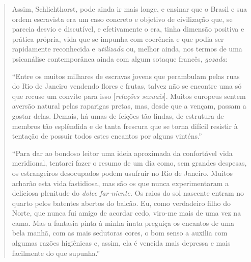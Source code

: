 \begin{quote}
Assim, Schlichthorst, pode ainda ir mais longe, e ensinar que o Brasil e
sua ordem escravista era um caso concreto e objetivo de civilização que,
se parecia desvio e discutível, e efetivamente o era, tinha dimensão
positiva e prática própria, vida que se impunha com coerência e que
podia ser rapidamente reconhecida e \emph{utilizada} ou, melhor ainda,
nos termos de uma psicanálise contemporânea ainda com algum sotaque
francês, \emph{gozada}:

``Entre os muitos milhares de escravas jovens que perambulam pelas ruas
do Rio de Janeiro vendendo flores e frutas, talvez não se encontre uma
só que recuse um convite para isso {[}\emph{relações sexuais}{]}. Muitos
europeus sentem aversão natural pelas raparigas pretas, mas, desde que a
vençam, passam a gostar delas. Demais, há umas de feições tão lindas, de
estrutura de membros tão esplêndida e de tanta frescura que se torna
difícil resistir à tentação de possuir todos estes encantos por alguns
vinténs.''

``Para dar ao bondoso leitor uma ideia aproximada da confortável vida
meridional, tentarei fazer o resumo de um dia como, sem grandes
despesas, os estrangeiros desocupados podem usufruir no Rio de Janeiro.
Muitos acharão esta vida fastidiosa, mas são os que nunca experimentaram
a deliciosa plenitude do \emph{dolce far-niente.} Os raios do sol
nascente entram no quarto pelos batentes abertos do balcão. Eu, como
verdadeiro filho do Norte, que nunca fui amigo de acordar cedo, viro-me
mais de uma vez na cama. Mas a fantasia pinta à minha inata preguiça os
encantos de uma bela manhã, com as mais sedutoras cores, o bom senso a
auxilia com algumas razões higiênicas e, assim, ela é vencida mais
depressa e mais facilmente do que supunha.''


\end{quote}
